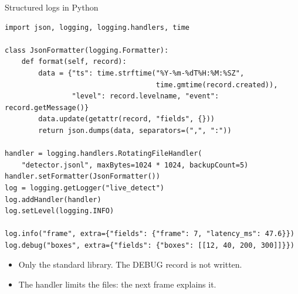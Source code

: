 \begin{frame}[fragile]{Structured logs in Python}
\begin{lstlisting}[style=python, basicstyle=\ttfamily\scriptsize]
import json, logging, logging.handlers, time

class JsonFormatter(logging.Formatter):
    def format(self, record):
        data = {"ts": time.strftime("%Y-%m-%dT%H:%M:%SZ",
                                    time.gmtime(record.created)),
                "level": record.levelname, "event": record.getMessage()}
        data.update(getattr(record, "fields", {}))
        return json.dumps(data, separators=(",", ":"))

handler = logging.handlers.RotatingFileHandler(
    "detector.jsonl", maxBytes=1024 * 1024, backupCount=5)
handler.setFormatter(JsonFormatter())
log = logging.getLogger("live_detect")
log.addHandler(handler)
log.setLevel(logging.INFO)

log.info("frame", extra={"fields": {"frame": 7, "latency_ms": 47.6}})
log.debug("boxes", extra={"fields": {"boxes": [[12, 40, 200, 300]]}})
\end{lstlisting}
  \small
  \begin{itemize}
    \item Only the standard library. The DEBUG record is not written.
    \item The handler limits the files: the next frame explains it.
  \end{itemize}
\end{frame}

